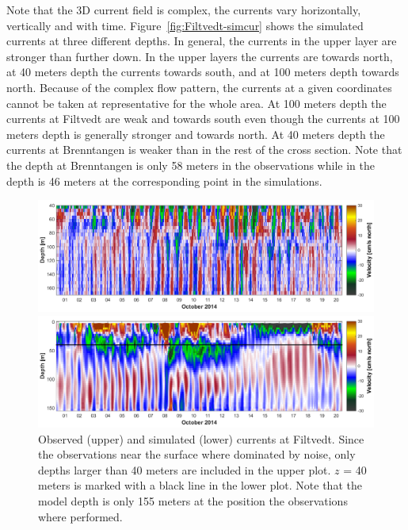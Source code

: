Note that the 3D current field is complex, the currents vary horizontally, vertically and with time. Figure~\ref{fig:Filtvedt-simcur} shows the simulated currents at three different depths. In general, the currents in the upper layer are stronger than further down. In the upper layers the currents are towards north, at 40 meters depth the currents towards south, and at 100 meters depth towards north. Because of the complex flow pattern, the currents at a given coordinates cannot be taken at representative for the whole area. At 100 meters depth the currents at Filtvedt are weak and towards south even though the currents at 100 meters depth is generally stronger and towards north. At 40 meters depth the currents at Brenntangen is weaker than in the rest of the cross section. Note that the depth at Brenntangen is only 58 meters in the observations while in the depth is 46 meters at the corresponding point in the simulations. 

\begin{figure}[ht]
\centerline{
\includegraphics*[trim=0 0 0 0,clip=true,width=\textwidth]{Figurer/Filtvedt_obs_cur}}
\centerline{
\includegraphics*[trim=0 0 0 0,clip=true,width=\textwidth]{Figurer/Filtvedt_sim_cur}}
\caption{\small
Observed (upper) and simulated (lower) currents at Filtvedt. Since the observations near the surface where dominated by noise, only depths larger than 40 meters are included in the upper plot. $z$ = 40 meters is marked with a black line in the lower plot. Note that the model depth is only 155 meters at the position the observations where performed.}
\label{fig:Filtvedt-cur}
\end{figure}

